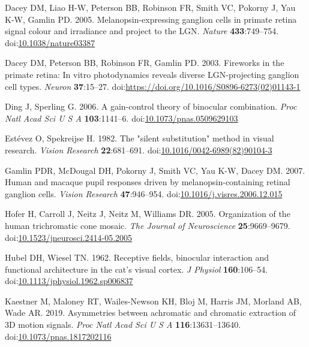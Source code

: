 \documentclass[
]{article}
\newlength{\cslhangindent}
\newlength{\cslentryspacingunit} %
\newenvironment{CSLReferences}[2] %
 {%
  \setlength{\parindent}{0pt}
  \ifodd #1
  \let\oldpar\par
  \def\par{\hangindent=\cslhangindent\oldpar}
  \fi
  \setlength{\parskip}{#2\cslentryspacingunit}
 }%
 {}
\begin{document}
\begin{CSLReferences}{1}{0}
\leavevmode{}%
Dacey DM, Liao H-W, Peterson BB, Robinson FR, Smith VC, Pokorny J, Yau K-W, Gamlin PD. 2005. Melanopsin-expressing ganglion cells in primate retina signal colour and irradiance and project to the {LGN}. \emph{Nature} \textbf{433}:749--754. doi:\href{https://doi.org/10.1038/nature03387}{10.1038/nature03387}

\leavevmode{}%
Dacey DM, Peterson BB, Robinson FR, Gamlin PD. 2003. Fireworks in the primate retina: In vitro photodynamics reveals diverse LGN-projecting ganglion cell types. \emph{Neuron} \textbf{37}:15--27. doi:\url{https://doi.org/10.1016/S0896-6273(02)01143-1}

\leavevmode{}%
Ding J, Sperling G. 2006. A gain-control theory of binocular combination. \emph{Proc Natl Acad Sci U S A} \textbf{103}:1141--6. doi:\href{https://doi.org/10.1073/pnas.0509629103}{10.1073/pnas.0509629103}

\leavevmode{}%
Estévez O, Spekreijse H. 1982. The "silent substitution" method in visual research. \emph{Vision Research} \textbf{22}:681--691. doi:\href{https://doi.org/10.1016/0042-6989(82)90104-3}{10.1016/0042-6989(82)90104-3}

\leavevmode{}%
Gamlin PDR, McDougal DH, Pokorny J, Smith VC, Yau K-W, Dacey DM. 2007. Human and macaque pupil responses driven by melanopsin-containing retinal ganglion cells. \emph{Vision Research} \textbf{47}:946--954. doi:\href{https://doi.org/10.1016/j.visres.2006.12.015}{10.1016/j.visres.2006.12.015}

\leavevmode{}%
Hofer H, Carroll J, Neitz J, Neitz M, Williams DR. 2005. Organization of the human trichromatic cone mosaic. \emph{The Journal of Neuroscience} \textbf{25}:9669--9679. doi:\href{https://doi.org/10.1523/jneurosci.2414-05.2005}{10.1523/jneurosci.2414-05.2005}

\leavevmode{}%
Hubel DH, Wiesel TN. 1962. Receptive fields, binocular interaction and functional architecture in the cat's visual cortex. \emph{J Physiol} \textbf{160}:106--54. doi:\href{https://doi.org/10.1113/jphysiol.1962.sp006837}{10.1113/jphysiol.1962.sp006837}

\leavevmode{}%
Kaestner M, Maloney RT, Wailes-Newson KH, Bloj M, Harris JM, Morland AB, Wade AR. 2019. Asymmetries between achromatic and chromatic extraction of 3D motion signals. \emph{Proc Natl Acad Sci U S A} \textbf{116}:13631--13640. doi:\href{https://doi.org/10.1073/pnas.1817202116}{10.1073/pnas.1817202116}


\end{CSLReferences}
\end{document}

